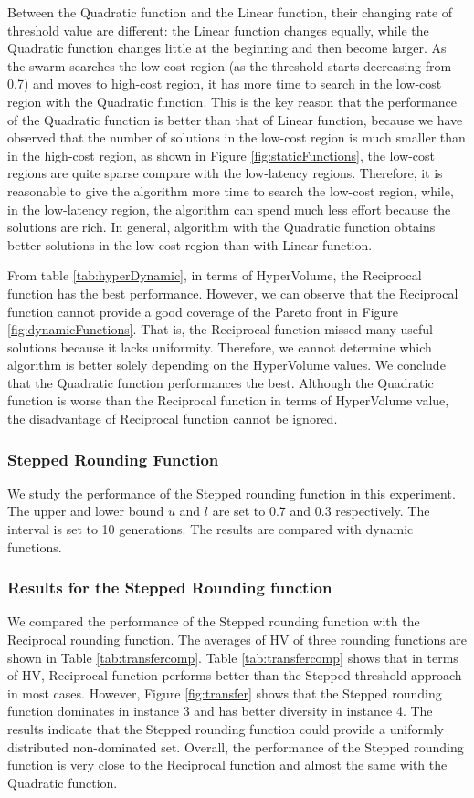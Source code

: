 \documentclass[10pt,journal,compsoc]{IEEEtran}
\begin{document}
Between the Quadratic function and the Linear function, their changing rate of threshold value are different: the Linear function changes equally, while the Quadratic function changes little at the beginning and then become larger. As the swarm searches the low-cost region (as the threshold starts decreasing from 0.7) and moves to high-cost region, it has more time to search in the low-cost region with the Quadratic function. This is the key reason that the performance of the Quadratic function is better than that of Linear function, because we have observed that the number of solutions in the low-cost region is much smaller than in the high-cost region, as shown in Figure \ref{fig:staticFunctions}, the low-cost regions are quite sparse compare with the low-latency regions. Therefore, it is reasonable to give the algorithm more time to search the low-cost region, while, in the low-latency region, the algorithm can spend much less effort because the solutions are rich. In general, algorithm with the Quadratic function obtains better solutions in the low-cost region than with Linear function.

From table \ref{tab:hyperDynamic}, in terms of HyperVolume, the Reciprocal function has the best performance. However, we can observe that the Reciprocal function cannot provide a good coverage of the Pareto front in Figure \ref{fig:dynamicFunctions}. That is, the Reciprocal function missed many useful solutions because it lacks uniformity. Therefore, we cannot determine which algorithm is better solely 
depending on the HyperVolume values. We conclude that the Quadratic function performances the best. Although the Quadratic function is worse than the Reciprocal function in terms of HyperVolume value, the disadvantage of Reciprocal function cannot be ignored.

\subsubsection{Stepped Rounding Function}
We study the performance of the Stepped rounding function in this experiment. The upper and lower bound $u$ and $l$ are set to 0.7 and 0.3 respectively. The interval is set to 10 generations. The results are compared with dynamic functions.

\subsubsection{Results for the Stepped Rounding function}
We compared the performance of the Stepped rounding function with the Reciprocal rounding function. The averages of HV of three rounding functions are shown in Table \ref{tab:transfercomp}. Table \ref{tab:transfercomp} shows that in terms of HV, Reciprocal function performs better than the Stepped threshold approach in most cases.
However, Figure \ref{fig:transfer} shows that the Stepped rounding function dominates in instance 3 and has better diversity in instance 4.
The results indicate that the Stepped rounding function could provide a uniformly distributed non-dominated set.
Overall, the performance of the Stepped rounding function is very close to the Reciprocal function and almost the same with the Quadratic function.
\end{document}
